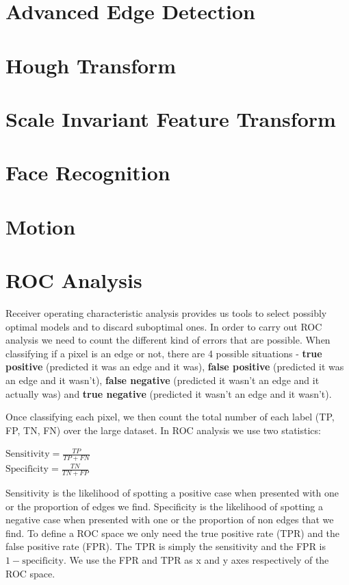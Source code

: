 \documentclass{article}
\begin{document}
	\section{Advanced Edge Detection}

	\section{Hough Transform}

	\section{Scale Invariant Feature Transform}

	\section{Face Recognition}

	\section{Motion}

	\section{ROC Analysis}
	Receiver operating characteristic analysis provides us tools to select possibly optimal models and to discard suboptimal ones. In order to carry out ROC analysis we need to count the different kind of errors that are possible. When classifying if a pixel is an edge or not, there are 4 possible situations - \textbf{true positive} (predicted it was an edge and it was), \textbf{false positive} (predicted it was an edge and it wasn't), \textbf{false negative} (predicted it wasn't an edge and it actually was) and \textbf{true negative} (predicted it wasn't an edge and it wasn't).
	
Once classifying each pixel, we then count the total number of each label (TP, FP, TN, FN) over the large dataset. In ROC analysis we use two statistics:
	\begin{multicols}{2}
		\noindent
		\centering
			$ \text{Sensitivity} = \frac{TP}{TP+FN}$ \\
			$ \text{Specificity} = \frac{TN}{TN+FP}$
	\end{multicols}	
	Sensitivity is the likelihood of spotting a positive case when presented with one or the proportion of edges we find. Specificity is the likelihood of spotting a negative case when presented with one or the proportion of non edges that we find. To define a ROC space we only need the true positive rate (TPR) and the false positive rate (FPR). The TPR is simply the sensitivity and the FPR is $1 - \text{specificity}$. We use the FPR and TPR as x and y axes respectively of the ROC space.
	
\end{document}
